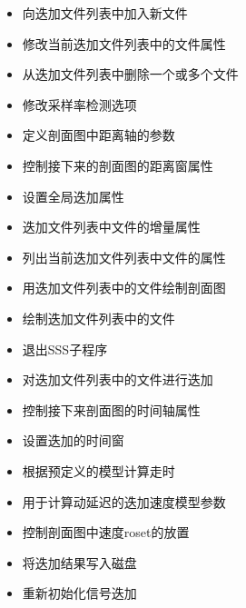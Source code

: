 \begin{itemize}
\item {} 向迭加文件列表中加入新文件
\item {} 修改当前迭加文件列表中的文件属性
\item {} 从迭加文件列表中删除一个或多个文件
\item {} 修改采样率检测选项
\item {} 定义剖面图中距离轴的参数
\item {} 控制接下来的剖面图的距离窗属性
\item {} 设置全局迭加属性
\item {} 迭加文件列表中文件的增量属性
\item {} 列出当前迭加文件列表中文件的属性
\item {} 用迭加文件列表中的文件绘制剖面图
\item {} 绘制迭加文件列表中的文件
\item {} 退出SSS子程序
\item {} 对迭加文件列表中的文件进行迭加
\item {} 控制接下来剖面图的时间轴属性
\item {} 设置迭加的时间窗
\item {} 根据预定义的模型计算走时
\item {} 用于计算动延迟的迭加速度模型参数
\item {} 控制剖面图中速度roset的放置
\item {} 将迭加结果写入磁盘
\item {} 重新初始化信号迭加
\end{itemize}
